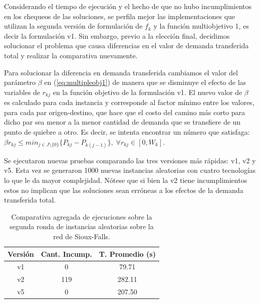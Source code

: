 Considerando el tiempo de ejecución y el hecho de que no hubo incumplimientos en los chequeos de las soluciones, se perfila mejor las implementaciones que utilizan la segunda versión de formulación de $f_k$ y la función multiobjetivo 1, es decir la formulación v1. Sin embargo, previo a la elección final, decidimos solucionar el problema que causa diferencias en el valor de demanda transferida total y realizar la comparativa nuevamente.

Para solucionar la diferencia en demanda transferida cambiamos el valor del parámetro $\beta$ en (\ref{eq:multipleobj1}) de manera que se disminuye el efecto de las variables de $r_{kj}$ en la función objetivo de la formulación v1. El nuevo valor de $\beta$ es calculado para cada instancia y corresponde al factor mínimo entre los valores, para cada par origen-destino, que hace que el costo del camino más corto para dicho par sea menor a la menor cantidad de demanda que se transfiere de un punto de quiebre a otro. Es decir, se intenta encontrar un número que satisfaga: $\beta r_{kj} \leq min_{j \in J \setminus \{0\}} \{ P_{kj} - P_{k(j-1)} \},\; \forall r_{kj} \in [0, W_k]$.

Se ejecutaron nuevas pruebas comparando las tres versiones más rápidas: v1, v2 y v5. Esta vez se generaron 1000 nuevas instancias aleatorias con cuatro tecnologías lo que le da mayor complejidad. Nótese que si bien la v2 tiene incumplimientos estos no implican que las soluciones sean erróneas a los efectos de la demanda transferida total.


\begin{table}[h!]
  \centering
  \begin{tabular}{ccc}
    \toprule
    Versión & Cant. Incump. & T. Promedio (s) \\
    \midrule
    v1 & 0   & 79.71   \\
    v2 & 119 & 282.11  \\
    v5 & 0   & 207.50  \\
    \bottomrule
  \end{tabular}
  \caption{Comparativa agregada de ejecuciones sobre la segunda ronda de instancias aleatorias sobre la red de Sioux-Falls.}\label{table:resumenreejecuciones}
\end{table}

